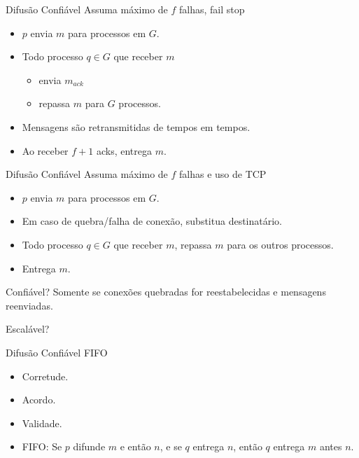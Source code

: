 \begin{frame}{Difusão Confiável}
Assuma máximo de $f$ falhas, fail stop

\begin{itemize}
\item $p$ envia $m$ para processos em $G$.
\item Todo processo $q \in G$ que receber $m$
\begin{itemize}
	\item envia $m_{ack}$
	\item repassa $m$ para $G$ processos.
\end{itemize}
\item Mensagens são retransmitidas de tempos em tempos.
\item Ao receber $f+1$ acks, entrega $m$.
\end{itemize}
\end{frame}

\begin{frame}{Difusão Confiável}
Assuma máximo de $f$ falhas e uso de TCP
\begin{itemize}
	\item $p$ envia $m$ para processos em $G$.
	\item Em caso de quebra/falha de conexão, substitua destinatário.
	\item Todo processo $q \in G$ que receber $m$, repassa $m$ para os outros  processos.
	\item Entrega $m$.
\end{itemize}

\pause Confiável? Somente se conexões quebradas for reestabelecidas e mensagens reenviadas.

\pause Escalável?
\end{frame}

\begin{frame}{Difusão Confiável FIFO}
\begin{itemize}
	\item Corretude.
	\item Acordo.	
	\item Validade.
	\item FIFO: Se $p$ difunde $m$ e então $n$, e se $q$ entrega $n$, então $q$ entrega $m$ antes $n$.
\end{itemize}
\end{frame}


